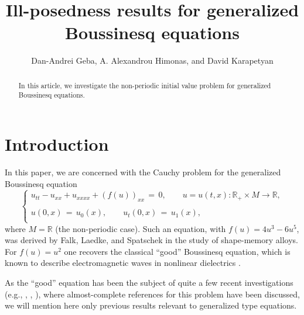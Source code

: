 \documentclass{amsart}
\begin{document}
\title{Ill-posedness results for generalized Boussinesq equations}

\author{Dan-Andrei Geba, A. Alexandrou Himonas, and David Karapetyan}

\address{Department of Mathematics, University of Rochester, Rochester, NY 14627}
\address{Department of Mathematics, University of Notre Dame, Notre Dame, IN 46556}
\address{Department of Mathematics, University of Rochester, Rochester, NY 14627}
\date{}

\begin{abstract}
In this article, we investigate the non-periodic initial value problem for generalized Boussinesq equations.
\end{abstract}


\maketitle

\section{Introduction}

In this paper, we are concerned with the Cauchy problem for the generalized Boussinesq equation
\begin{equation}
\left\{
\begin{array}{l}
u_{tt}-u_{xx}+u_{xxxx}+(f(u))_{xx}\,=\,0, \qquad u=u(t,x): \mathbb{R}_+\times M \to \mathbb{R},\\
\\
u(0,x)\,=\,u_0(x),\qquad u_t(0,x)\,=\,u_1(x),\\
\end{array}\right.
\label{main}
\end{equation}
where $M=\mathbb{R}$ (the non-periodic case). Such an  equation, with $f(u)=4u^3-6u^5$, was derived by Falk, Laedke, and Spatschek \cite{FLS} in the study of shape-memory alloys. For $f(u) =  u^{2}$ one recovers the classical ``good'' Boussinesq equation, which is known to describe electromagnetic waves in nonlinear dielectrics \cite{T93}. 

As the ``good'' equation has been the subject of quite a few recent investigations (e.g., \cite{KT10}, \cite{OS12}, \cite{K12}), where almost-complete references for this problem have been discussed, we will mention here only previous results relevant to generalized type equations. 
\end{document}
